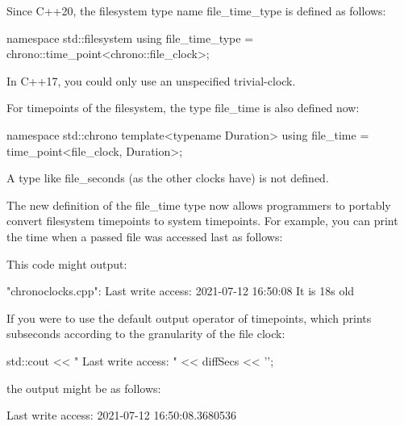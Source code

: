 Since C++20, the filesystem type name file\_time\_type is defined as follows:

\begin{cpp}
namespace std::filesystem {
	using file_time_type = chrono::time_point<chrono::file_clock>;
}
\end{cpp}

In C++17, you could only use an unspecified trivial-clock.

For timepoints of the filesystem, the type file\_time is also defined now:

\begin{cpp}
namespace std::chrono {
	template<typename Duration>
	using file_time = time_point<file_clock, Duration>;
}
\end{cpp}

A type like file\_seconds (as the other clocks have) is not defined.

The new definition of the file\_time type now allows programmers to portably convert filesystem timepoints to system timepoints. For example, you can print the time when a passed file was accessed last as follows:


This code might output:

\begin{shell}
"chronoclocks.cpp":
 Last write access: 2021-07-12 16:50:08
 It is 18s old
\end{shell}

If you were to use the default output operator of timepoints, which prints subseconds according to the granularity of the file clock:

\begin{cpp}
std::cout << " Last write access: " << diffSecs << '\n';
\end{cpp}

the output might be as follows:

\begin{shell}
Last write access: 2021-07-12 16:50:08.3680536
\end{shell}

